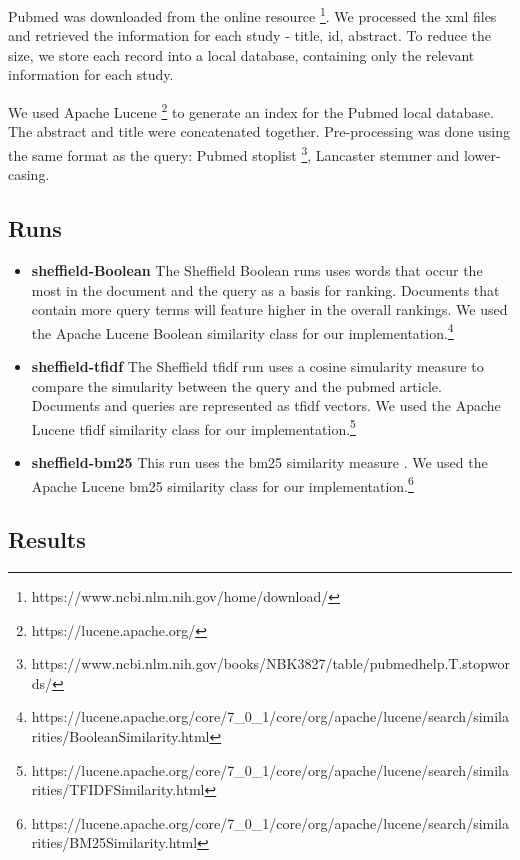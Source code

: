 Pubmed was downloaded from the online resource \footnote{https://www.ncbi.nlm.nih.gov/home/download/}. We processed the xml files and retrieved the information for each study - title, id, abstract. To reduce the size, we store each record into a local database, containing only the relevant information for each study.

We used Apache Lucene \footnote{https://lucene.apache.org/} to generate an index for the Pubmed local database. The abstract and title were concatenated together. Pre-processing was done using the same format as the query: Pubmed stoplist \footnote{https://www.ncbi.nlm.nih.gov/books/NBK3827/table/pubmedhelp.T.stopwords/}, Lancaster stemmer and lower-casing. 


\subsection{Runs}

\begin{itemize}
\item \textbf{sheffield-Boolean}  
The Sheffield Boolean runs uses words that occur the most in the document and the query as a basis for ranking. Documents that contain more query terms will feature higher in the overall rankings. We used the Apache Lucene Boolean similarity class for our implementation.\footnote{https://lucene.apache.org/core/7\_0\_1/core/org/apache/lucene/search/similarities/BooleanSimilarity.html}

\item \textbf{sheffield-tfidf} The Sheffield tfidf run uses a cosine simularity measure to compare the simularity between the query and the pubmed article. Documents and queries are represented as tfidf vectors. We used the Apache Lucene tfidf similarity class for our implementation.\footnote{https://lucene.apache.org/core/7\_0\_1/core/org/apache/lucene/search/similarities/TFIDFSimilarity.html}

\item \textbf{sheffield-bm25} This run uses the bm25 similarity measure \cite{Robertson96okapiat}. We used the Apache Lucene bm25 similarity class for our implementation.\footnote{https://lucene.apache.org/core/7\_0\_1/core/org/apache/lucene/search/similarities/BM25Similarity.html}

\end{itemize}

\subsection{Results}

